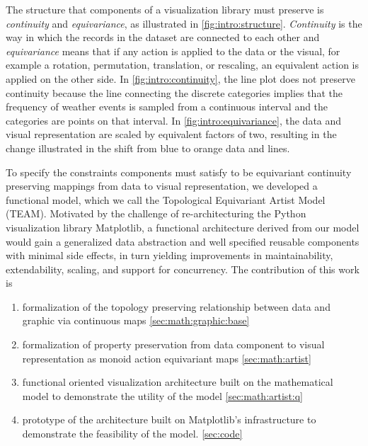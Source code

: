 \documentclass[journal]{vgtc}                %
\begin{document}
The structure that components of a visualization library must preserve is \textit{continuity} and \textit{equivariance}, as illustrated in \autoref{fig:intro:structure}. \textit{Continuity} is the way in which the records in the dataset are connected to each other and \textit{equivariance} means that if any action is applied to the data or the visual, for example a rotation, permutation, translation, or rescaling, an equivalent action is applied on the other side. In \autoref{fig:intro:continuity}, the line plot does not preserve continuity because the line connecting the discrete categories implies that the frequency of weather events is sampled from a continuous interval and the categories are points on that interval. In \autoref{fig:intro:equivariance}, the data and visual representation are scaled by equivalent factors of two, resulting in the change illustrated in the shift from blue to orange data and lines. 

To specify the constraints components must satisfy to be equivariant continuity preserving mappings from data to visual representation, we developed a functional model, which we call the Topological Equivariant Artist Model (TEAM). Motivated by the challenge of re-architecturing the Python visualization library Matplotlib, a functional architecture derived from our model would gain a generalized data abstraction and well specified reusable components with minimal side effects\cite{loudenProgrammingLanguagesPrinciples2010}, in turn yielding improvements in maintainability, extendability, scaling, and support for concurrency. The contribution of this work is 
\begin{enumerate}
  \item formalization of the topology preserving relationship between data and graphic via continuous maps \autoref{sec:math:graphic:base}
  \item formalization of property preservation from data component to visual representation as monoid action equivariant maps \autoref{sec:math:artist}
  \item functional oriented visualization architecture built on the mathematical model to demonstrate the utility of the model \autoref{sec:math:artist:q}
  \item prototype of the architecture built on Matplotlib's infrastructure to demonstrate the feasibility of the model. \autoref{sec:code}
\end{enumerate}
\end{document}
